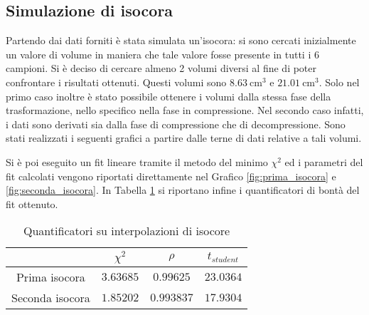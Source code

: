 \documentclass[a4paper,11pt,oneside]{article}
\begin{document}
\subsection{Simulazione di isocora}
Partendo dai dati forniti è stata simulata un'isocora: si sono cercati inizialmente un valore di volume in maniera che tale valore fosse presente in tutti i 6 campioni. Si è deciso di cercare almeno 2 volumi diversi al fine di poter confrontare i risultati ottenuti. Questi volumi sono $\SI{8.63}{\centi\meter\cubed}$ e $\SI{21.01}{\centi\meter\cubed}$. Solo nel primo caso inoltre è stato possibile ottenere i volumi dalla stessa fase della trasformazione, nello specifico nella fase in compressione. Nel secondo caso infatti, i dati sono derivati sia dalla fase di compressione che di decompressione.
Sono stati realizzati i seguenti grafici a partire dalle terne di dati relative a tali volumi.
\begin{figure}[h!]
    \centering
    \label{fig:isocore}
\end{figure}
Si è poi eseguito un fit lineare tramite il metodo del minimo $\chi^2$ ed i parametri del fit calcolati vengono riportati direttamente nel Grafico \ref{fig:prima_isocora} e \ref{fig:seconda_isocora}. In Tabella \ref{tab:quantificatori_isocore} si riportano infine i quantificatori di bontà del fit ottenuto.

\begin{table}[h!]
    \centering
    \begin{tabular}{|c|c|c|c|}
        \hline
         & $\chi^2$ & $\rho$ & $t_{student}$ \\ \hline
        \rowcolor[rgb]{0.85,0.85,0.85} Prima isocora & $3.63685$ & $0.99625$ & $23.0364$ \\ \hline
        Seconda isocora & $1.85202$ & $0.993837$ & $17.9304$ \\ \hline
    \end{tabular}
    \caption{Quantificatori su interpolazioni di isocore}
    \label{tab:quantificatori_isocore}
\end{table}
\end{document}
